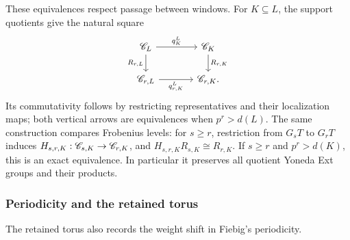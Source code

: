 \documentclass[11pt,reqno]{amsart}
\theoremstyle{definition}
\theoremstyle{remark}
\numberwithin{equation}{section}
\begin{document}
These equivalences respect passage between windows. For
$K\subseteq L$, the support quotients give the natural square
\begin{equation}\label{eq:nested-frobenius-square}
 \begin{tikzcd}[column sep=large]
 \CC_L \arrow[r,"q_K^L"] \arrow[d,"R_{r,L}"'] &
 \CC_K \arrow[d,"R_{r,K}"]\\
 \CC_{r,L} \arrow[r,"q_{r,K}^L"'] & \CC_{r,K}.
 \end{tikzcd}
\end{equation}
Its commutativity follows by restricting representatives and their
localization maps; both vertical arrows are equivalences when
$p^r>d(L)$. The same construction compares Frobenius levels:
for $s\geq r$, restriction from $G_sT$ to $G_rT$ induces
$H_{s,r,K}:\mathscr C_{s,K}\to\mathscr C_{r,K}$, and
$H_{s,r,K}R_{s,K}\cong R_{r,K}$. If $s\geq r$ and
$p^r>d(K)$, this is an exact equivalence. In particular it
preserves all quotient Yoneda Ext groups and their products.

\subsubsection{Periodicity and the retained torus}
The retained torus also records the weight shift in Fiebig's
periodicity.
\end{document}
